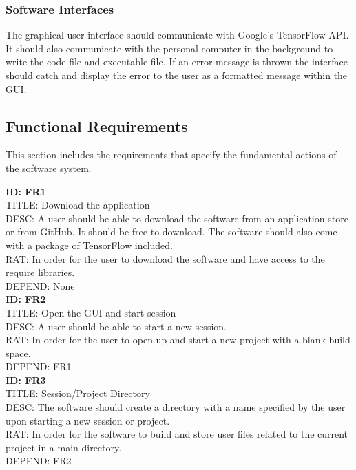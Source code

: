 \documentclass[journal,10pt,onecolumn,compsoc]{IEEEtran} \usepackage[margin=1.0in]{geometry} \usepackage{pdfpages} \usepackage{graphicx}
\begin{document}
\subsubsection{Software Interfaces}

The graphical user interface should communicate with Google's TensorFlow API.
It should also communicate with the personal computer in the background to write the code file and executable file.
If an error message is thrown the interface should catch and display the error to the user as a formatted message within the GUI.

\subsection{Functional Requirements}

This section includes the requirements that specify the fundamental actions of the software system.

\noindent
\textbf{ID: FR1}\\
TITLE: Download the application\\
DESC: A user should be able to download the software from an application store or from GitHub. It should be free to download. 
The software should also come with a package of TensorFlow included.\\
RAT: In order for the user to download the software and have access to the require libraries.\\
DEPEND: None\\

\noindent
\textbf{ID: FR2}\\
TITLE: Open the GUI and start session\\
DESC: A user should be able to start a new session. \\
RAT: In order for the user to open up and start a new project with a blank build space.\\
DEPEND: FR1\\

\noindent
\textbf{ID: FR3}\\
TITLE: Session/Project Directory\\
DESC: The software should create a directory with a name specified by the user upon starting a new session or project.\\
RAT: In order for the software to build and store user files related to the current project in a main directory.\\
DEPEND: FR2\\
\end{document}
